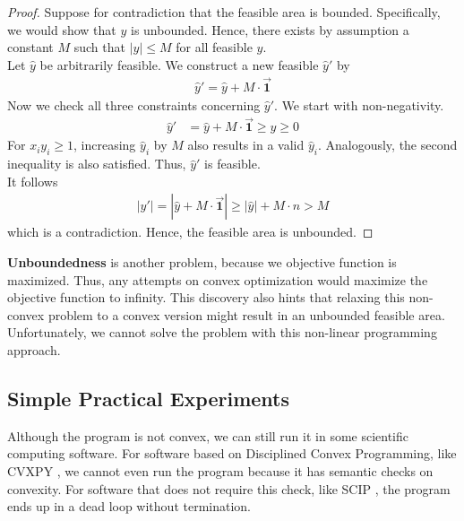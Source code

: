 \documentclass[12pt,letterpaper]{article}
\begin{document}
\begin{proof}
    Suppose for contradiction that the feasible area is bounded.
    Specifically, we would show that $y$ is unbounded. Hence, 
    there exists by assumption a constant $M$ such that $|y| \leq M$ for all 
    feasible $y$. \\ 
    Let $\hat{y}$ be arbitrarily feasible. We construct a new feasible $\hat{y}'$ by 
    \begin{align*}
        \hat{y}' = \hat{y} + M \cdot \vec{\mathbf{1}}
    \end{align*} 
    Now we check all three constraints concerning $\hat{y}'$.
    We start with non-negativity.
    \begin{align*}
        \hat{y}' &= \hat{y} + M \cdot \vec{\mathbf{1}} \geq \hat{y} \geq 0
    \end{align*}
    For $x_iy_i \geq 1$, increasing $\hat{y}_i$ by $M$ also results in a valid $\hat{y}_i$.
    Analogously, the second inequality is also satisfied. Thus, $\hat{y}'$ is feasible. \\
    It follows 
    \begin{align*}
        |\hat{y}'| = |\hat{y} + M \cdot \vec{\mathbf{1}}| \geq |\hat{y}| + M \cdot n > M
    \end{align*}
    which is a contradiction. Hence, the feasible area is unbounded.
\end{proof}

\textbf{Unboundedness} is another problem, because we objective function is maximized. 
Thus, any attempts on convex optimization would maximize the objective function to infinity.
This discovery also hints that relaxing this non-convex problem 
to a convex version might result in an unbounded feasible area.
Unfortunately, we cannot solve the problem with this non-linear programming approach. 

\subsection{Simple Practical Experiments}
Although the program is not convex, we can still run it in some scientific computing software.
For software based on Disciplined Convex Programming, like CVXPY \cite{diamond2016cvxpy}, we cannot even run the program 
because it has semantic checks on convexity. For software that does not require this check, like SCIP \cite{BolusaniEtal2024ZR}, the program 
ends up in a dead loop without termination. 
\end{document}
